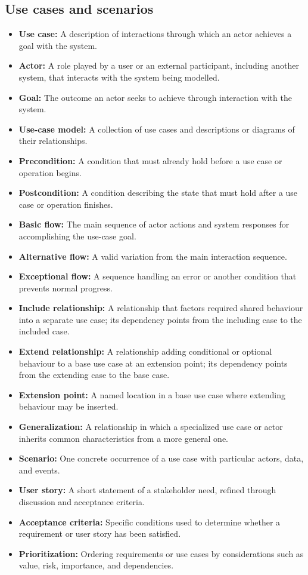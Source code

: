 \documentclass[11pt]{article}
\newenvironment{DottedList}{%
  \begin{itemize}[leftmargin=2em, itemsep=0.35em, topsep=0.35em, label=\textbullet]
}{%
  \end{itemize}
}
\begin{document}
\subsection*{Use cases and scenarios}
\begin{DottedList}
  \item \textbf{Use case:} A description of interactions through which an actor achieves a goal with the system.
  \item \textbf{Actor:} A role played by a user or an external participant, including another system, that interacts with the system being modelled.
  \item \textbf{Goal:} The outcome an actor seeks to achieve through interaction with the system.
  \item \textbf{Use-case model:} A collection of use cases and descriptions or diagrams of their relationships.
  \item \textbf{Precondition:} A condition that must already hold before a use case or operation begins.
  \item \textbf{Postcondition:} A condition describing the state that must hold after a use case or operation finishes.
  \item \textbf{Basic flow:} The main sequence of actor actions and system responses for accomplishing the use-case goal.
  \item \textbf{Alternative flow:} A valid variation from the main interaction sequence.
  \item \textbf{Exceptional flow:} A sequence handling an error or another condition that prevents normal progress.
  \item \textbf{Include relationship:} A relationship that factors required shared behaviour into a separate use case; its dependency points from the including case to the included case.
  \item \textbf{Extend relationship:} A relationship adding conditional or optional behaviour to a base use case at an extension point; its dependency points from the extending case to the base case.
  \item \textbf{Extension point:} A named location in a base use case where extending behaviour may be inserted.
  \item \textbf{Generalization:} A relationship in which a specialized use case or actor inherits common characteristics from a more general one.
  \item \textbf{Scenario:} One concrete occurrence of a use case with particular actors, data, and events.
  \item \textbf{User story:} A short statement of a stakeholder need, refined through discussion and acceptance criteria.
  \item \textbf{Acceptance criteria:} Specific conditions used to determine whether a requirement or user story has been satisfied.
  \item \textbf{Prioritization:} Ordering requirements or use cases by considerations such as value, risk, importance, and dependencies.
\end{DottedList}
\end{document}

